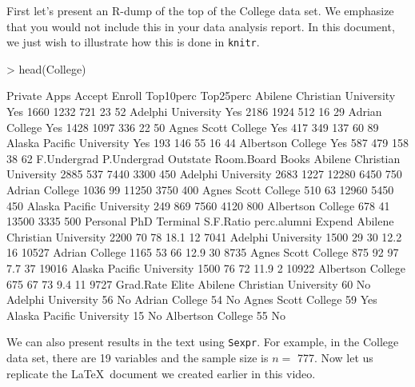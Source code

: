 \documentclass{article}
\begin{document}
First let's present an R-dump of the top of the College data set.  We emphasize that you would not include this in your data analysis report.  In this document, we just wish to illustrate how this is done in \texttt{knitr}.
\begin{Schunk}
\begin{Sinput}
> head(College)
\end{Sinput}
\begin{Soutput}
                             Private Apps Accept Enroll Top10perc Top25perc
Abilene Christian University     Yes 1660   1232    721        23        52
Adelphi University               Yes 2186   1924    512        16        29
Adrian College                   Yes 1428   1097    336        22        50
Agnes Scott College              Yes  417    349    137        60        89
Alaska Pacific University        Yes  193    146     55        16        44
Albertson College                Yes  587    479    158        38        62
                             F.Undergrad P.Undergrad Outstate Room.Board Books
Abilene Christian University        2885         537     7440       3300   450
Adelphi University                  2683        1227    12280       6450   750
Adrian College                      1036          99    11250       3750   400
Agnes Scott College                  510          63    12960       5450   450
Alaska Pacific University            249         869     7560       4120   800
Albertson College                    678          41    13500       3335   500
                             Personal PhD Terminal S.F.Ratio perc.alumni Expend
Abilene Christian University     2200  70       78      18.1          12   7041
Adelphi University               1500  29       30      12.2          16  10527
Adrian College                   1165  53       66      12.9          30   8735
Agnes Scott College               875  92       97       7.7          37  19016
Alaska Pacific University        1500  76       72      11.9           2  10922
Albertson College                 675  67       73       9.4          11   9727
                             Grad.Rate Elite
Abilene Christian University        60    No
Adelphi University                  56    No
Adrian College                      54    No
Agnes Scott College                 59   Yes
Alaska Pacific University           15    No
Albertson College                   55    No
\end{Soutput}
\end{Schunk}


We can also present results in the text using {\tt Sexpr}.  For example, in the College data set, there are 19 variables and the sample size is $n = $ 777.  Now let us replicate the \LaTeX\ document we created earlier in this video.
\end{document}
